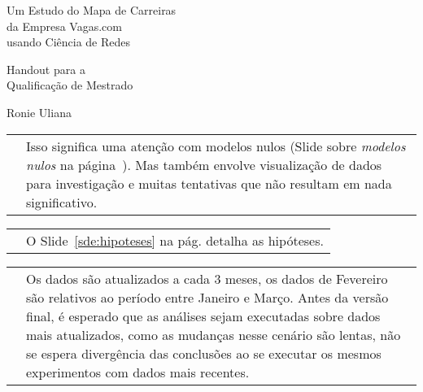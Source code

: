 \documentclass[10pt,a4paper,final]{article}
\begin{document}
\pagestyle{empty}
\begin{center}
  \vspace*{\fill}
  
  {\Huge Um Estudo do Mapa de Carreiras \\
    da Empresa Vagas.com \\
    usando Ciência de Redes}
  
  \vspace{3\baselineskip}
  
  {\Large Handout para a \\
    Qualificação de Mestrado}
  
  \vspace{3\baselineskip}
    
  Ronie Uliana
  
  \vspace{\fill}
\end{center}

\newpage

\small

\begin{tabular}{p{.45\linewidth} P{.45\linewidth}}
  \vspace{0pt}
  &
  \vspace{2pt}
  Isso significa uma atenção com modelos nulos (Slide sobre \textit{modelos nulos} na página~\pageref{sde:modelos-nulos}). Mas também envolve visualização de dados para investigação e muitas tentativas que não resultam em nada significativo.
\end{tabular}

\begin{tabular}{p{.45\linewidth} P{.45\linewidth}}
  \vspace{0pt}
  &
  \vspace{2pt}
  O Slide~\ref{sde:hipoteses} na pág.\pageref{sde:hipoteses} detalha as hipóteses.
\end{tabular}

\begin{tabular}{p{.45\linewidth} P{.45\linewidth}}
  \vspace{0pt}
  &
  \vspace{2pt}
  Os dados são atualizados a cada 3 meses, os dados de Fevereiro são relativos ao período entre Janeiro e Março. Antes da versão final, é esperado que as análises sejam executadas sobre dados mais atualizados, como as mudanças nesse cenário são lentas, não se espera divergência das conclusões ao se executar os mesmos experimentos com dados mais recentes.
\end{tabular}
\end{document}
